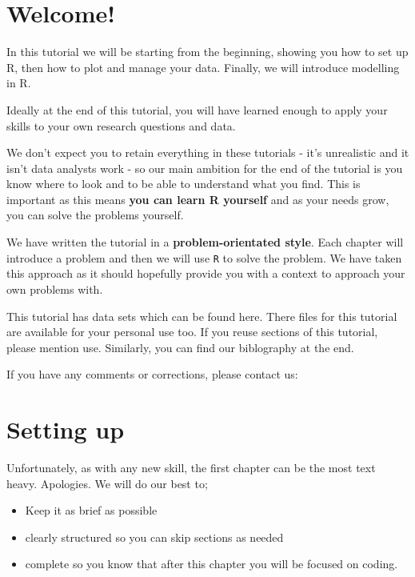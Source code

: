 \documentclass[]{book}
\title{}
\author{}
\date{}
\providecommand{\tightlist}{%
  \setlength{\itemsep}{0pt}\setlength{\parskip}{0pt}}
\begin{document}
{
\setcounter{tocdepth}{1}
\tableofcontents
}
\hypertarget{welcome}{%
\chapter{Welcome!}\label{welcome}}

In this tutorial we will be starting from the beginning, showing you how to set up R, then how to plot and manage your data. Finally, we will introduce modelling in R.

Ideally at the end of this tutorial, you will have learned enough to apply your skills to your own research questions and data.

We don't expect you to retain everything in these tutorials - it's unrealistic and it isn't data analysts work - so our main ambition for the end of the tutorial is you know where to look and to be able to understand what you find. This is important as this means \textbf{you can learn R yourself} and as your needs grow, you can solve the problems yourself.

We have written the tutorial in a \textbf{problem-orientated style}. Each chapter will introduce a problem and then we will use \texttt{R} to solve the problem. We have taken this approach as it should hopefully provide you with a context to approach your own problems with.

This tutorial has data sets which can be found here. There files for this tutorial are available for your personal use too. If you reuse sections of this tutorial, please mention use. Similarly, you can find our biblography at the end.

If you have any comments or corrections, please contact us:

\hypertarget{setting-up}{%
\chapter{Setting up}\label{setting-up}}

Unfortunately, as with any new skill, the first chapter can be the most text heavy. Apologies. We will do our best to;

\begin{itemize}
\tightlist
\item
  Keep it as brief as possible
\item
  clearly structured so you can skip sections as needed
\item
  complete so you know that after this chapter you will be focused on coding.
\end{itemize}
\end{document}
